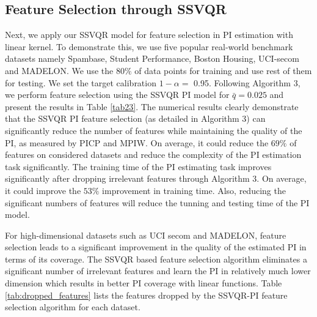 \documentclass[10pt]{article} %
\begin{document}
\subsection{Feature Selection through SSVQR}
Next, we apply our SSVQR model for feature selection in PI estimation with linear kernel. To demonstrate this, we use five popular real-world benchmark datasets 
namely Spambase, Student Performance, Boston Housing, UCI-secom and MADELON. We use the $80\%$ of data points for training and use rest of them for testing. We set the target calibration $1-\alpha=$ 0.95.  Following Algorithm 3, we perform feature selection using the SSVQR PI model for  $\bar{q} =0.025$ and present the results in Table \ref{tab23}.
The numerical results clearly demonstrate that the SSVQR PI feature selection (as detailed in Algorithm 3) can significantly reduce the number of features while maintaining the quality of the PI, as measured by PICP and MPIW. On average, it could reduce the $69\%$ of features on considered  datasets and reduce the complexity of the PI estimation task significantly. The training time of the PI estimating task improves significantly after dropping irrelevant features through Algorithm 3. On average, it could improve the $53\%$ improvement in training time. Also,  reducing the significant numbers of features will reduce the tunning and testing time of the  PI model. 


For high-dimensional datasets such as UCI secom and MADELON, feature selection leads to a significant improvement in the quality of the estimated PI in terms of its coverage. The SSVQR  based feature selection algorithm eliminates a significant number of irrelevant features and learn the PI in  relatively much lower dimension which results in better PI coverage with linear functions. Table \ref{tab:dropped_features} lists the features dropped by the SSVQR-PI feature selection algorithm for each dataset.


\end{document}
